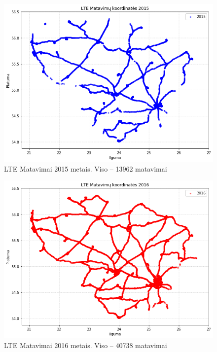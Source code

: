 \documentclass{VUMIFPSbakalaurinis}
\begin{document}
\begin{figure}[H]
	\centering
	\includegraphics[scale=0.5]{img/LTE-2}
	\caption{LTE Matavimai 2015 metais. Viso – 13962 matavimai}
	\label{img:LTE-2}
\end{figure}
\begin{figure}[H]
	\centering
	\includegraphics[scale=0.5]{img/LTE-3}
	\caption{LTE Matavimai 2016 metais. Viso – 40738 matavimai}
	\label{img:LTE-3}
\end{figure}
\end{document}
